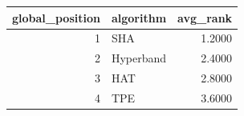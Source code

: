 \begin{tabular}{rlr}
\toprule
global_position & algorithm & avg_rank \\
\midrule
1 & SHA & 1.2000 \\
2 & Hyperband & 2.4000 \\
3 & HAT & 2.8000 \\
4 & TPE & 3.6000 \\
\bottomrule
\end{tabular}
